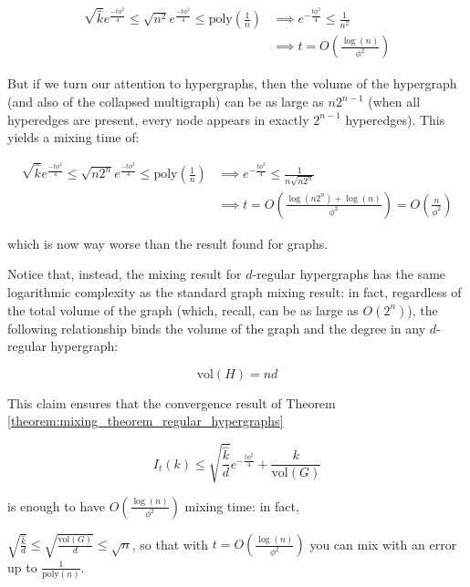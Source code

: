 \documentclass[../main.tex]{subfiles}
\begin{document}
\begin{align}
    \sqrt{\hat{k}} e^{\frac{-t \phi^2}{4}} \leq 
    \sqrt{n^2} e^{\frac{-t \phi^2}{4}}
    \leq \text{poly}\left(\frac{1}{n}\right) &\implies 
    e^{-\frac{t \phi^2}{4}} \leq \frac{1}{n^2} \\
    & \implies t =  O\left(\frac{\log(n)}{\phi^2}\right)
\end{align}

But if we turn our attention to hypergraphs, then the volume of the hypergraph (and also of the collapsed multigraph) can be as large as $n 2^{n-1}$ (when all hyperedges are present, every node appears in exactly $2^{n-1}$ hyperedges). This yields a mixing time of:

\begin{align}
    \sqrt{\hat{k}} e^{\frac{-t \phi^2}{4}} \leq 
    \sqrt{n2^n} e^{\frac{-t \phi^2}{4}}
    \leq \text{poly}\left(\frac{1}{n}\right) &\implies 
    e^{-\frac{t \phi^2}{4}} \leq \frac{1}{n\sqrt{n2^n}} \\
    & \implies t = O\left(\frac{\log(n2^n) + \log(n)}{\phi^2}\right) = O\left(\frac{n}{\phi^2}\right)
\end{align}

which is now way worse than the result found for graphs.

Notice that, instead, the mixing result for $d$-regular hypergraphs has the same logarithmic complexity as the standard graph mixing result: in fact, regardless of the total volume of the graph (which, recall, can be as large as $O(2^n)$), the following relationship binds the volume of the graph and the degree in any $d$-regular hypergraph:

\begin{equation}
    \text{vol}(H) = n d
\end{equation}

This claim ensures that the convergence result of Theorem \ref{theorem:mixing_theorem_regular_hypergraphs}

\begin{equation}
    I_t(k) \leq \sqrt{\frac{\hat{k}}{d}} e^{-\frac{t\phi^2}{4}} + \frac{k}{\text{vol}(G)}
\end{equation}

is enough to have $O\left(\frac{\log(n)}{\phi^2}\right)$ mixing time: in fact, 

$\sqrt{\frac{\hat{k}}{d}} \leq \sqrt{\frac{\text{vol}(G)}{d}} \leq \sqrt{n}$, so that with $t = O\left(\frac{\log(n)}{\phi^2}\right)$ you can mix with an error up to $\frac{1}{\text{poly}(n)}$.
\end{document}
